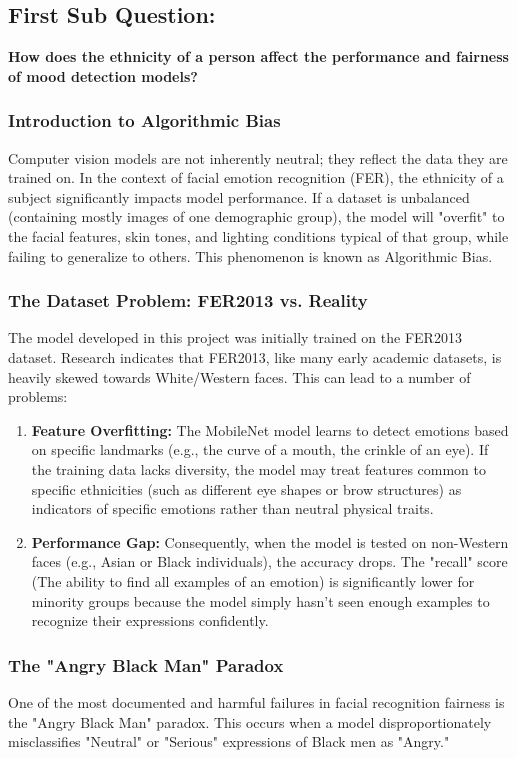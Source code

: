 \documentclass[12pt,a4paper]{article}
\begin{document}
\subsection{First Sub Question:}
\textbf{How does the ethnicity of a person affect the performance and fairness of mood detection models?}

\subsubsection*{Introduction to Algorithmic Bias}
Computer vision models are not inherently neutral; they reflect the data they are trained on. In the context of facial emotion recognition (FER), the ethnicity of a subject significantly impacts model performance. If a dataset is unbalanced (containing mostly images of one demographic group), the model will "overfit" to the facial features, skin tones, and lighting conditions typical of that group, while failing to generalize to others. This phenomenon is known as Algorithmic Bias.

\subsubsection*{The Dataset Problem: FER2013 vs. Reality}
The model developed in this project was initially trained on the FER2013 dataset. Research indicates that FER2013, like many early academic datasets, is heavily skewed towards White/Western faces. This can lead to a number of problems: 
\begin{enumerate}
\item \textbf{Feature Overfitting:} The MobileNet model learns to detect emotions based on specific landmarks (e.g., the curve of a mouth, the crinkle of an eye). If the training data lacks diversity, the model may treat features common to specific ethnicities (such as different eye shapes or brow structures) as indicators of specific emotions rather than neutral physical traits.

\item \textbf{Performance Gap:} Consequently, when the model is tested on non-Western faces (e.g., Asian or Black individuals), the accuracy drops. The "recall" score (The ability to find all examples of an emotion) is significantly lower for minority groups because the model simply hasn't seen enough examples to recognize their expressions confidently.
\end{enumerate}
\newpage
\subsubsection*{The "Angry Black Man" Paradox}
One of the most documented and harmful failures in facial recognition fairness is the "Angry Black Man" paradox. This occurs when a model disproportionately misclassifies "Neutral" or "Serious" expressions of Black men as "Angry."
\end{document}
